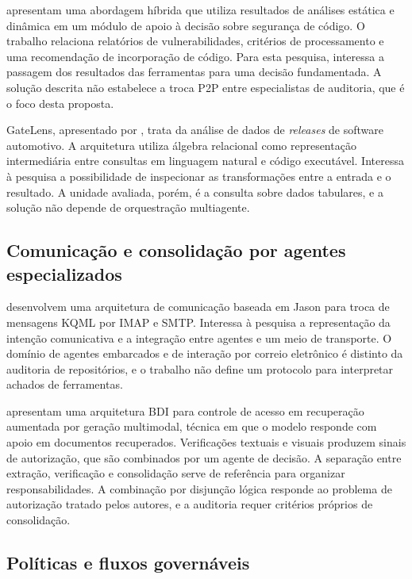  apresentam uma abordagem híbrida que utiliza resultados de análises estática e dinâmica em um módulo de apoio à decisão sobre segurança de código. O trabalho relaciona relatórios de vulnerabilidades, critérios de processamento e uma recomendação de incorporação de código. Para esta pesquisa, interessa a passagem dos resultados das ferramentas para uma decisão fundamentada. A solução descrita não estabelece a troca P2P entre especialistas de auditoria, que é o foco desta proposta.

GateLens, apresentado por , trata da análise de dados de \textit{releases} de software automotivo. A arquitetura utiliza álgebra relacional como representação intermediária entre consultas em linguagem natural e código executável. Interessa à pesquisa a possibilidade de inspecionar as transformações entre a entrada e o resultado. A unidade avaliada, porém, é a consulta sobre dados tabulares, e a solução não depende de orquestração multiagente.

\subsection{Comunicação e consolidação por agentes especializados}
\label{rt-2-6-2}

 desenvolvem uma arquitetura de comunicação baseada em Jason \cite{bordini2007} para troca de mensagens KQML por IMAP e SMTP. Interessa à pesquisa a representação da intenção comunicativa e a integração entre agentes e um meio de transporte. O domínio de agentes embarcados e de interação por correio eletrônico é distinto da auditoria de repositórios, e o trabalho não define um protocolo para interpretar achados de ferramentas.

 apresentam uma arquitetura BDI para controle de acesso em recuperação aumentada por geração multimodal, técnica em que o modelo responde com apoio em documentos recuperados. Verificações textuais e visuais produzem sinais de autorização, que são combinados por um agente de decisão. A separação entre extração, verificação e consolidação serve de referência para organizar responsabilidades. A combinação por disjunção lógica responde ao problema de autorização tratado pelos autores, e a auditoria requer critérios próprios de consolidação.

\subsection{Políticas e fluxos governáveis}
\label{rt-2-6-3}

